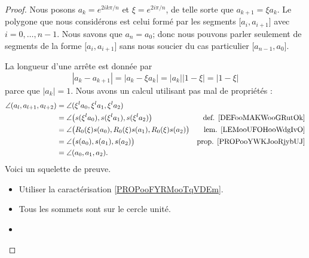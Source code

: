 \begin{proof}
    Nous posons \( a_k= e^{2ik\pi /n}\) et \( \xi= e^{2i\pi/n}\), de telle sorte que \( a_{k+1}=\xi a_k\). Le polygone que nous considérons est celui formé par les segments \( \mathopen[ a_i , a_{i+1} \mathclose]\) avec \( i=0,\ldots, n-1\). Nous savons que \( a_n=a_0\); donc nous pouvons parler seulement de segments de la forme \( \mathopen[ a_i , a_{i+1} \mathclose]\) sans nous soucier du cas particulier \( \mathopen[ a_{n-1} , a_0 \mathclose]\).
    \begin{subproof}
        \spitem[Longueurs]
        La longueur d'une arrête est donnée par
        \begin{equation}
            | a_k-a_{k+1} |=| a_k-\xi a_k |=| a_k | |1-\xi |=| 1-\xi |
        \end{equation}
        parce que \( | a_k |=1\).
        \spitem[Angles]
            Nous avons un calcul utilisant pas mal de propriétés :
            \begin{subequations}
                \begin{align}
                    \angle(a_l,a_{l+1},a_{l+2})&=\angle(\xi^la_0,\xi^la_1,\xi^la_2)     \\
                    &=\angle\big( s(\xi^la_0),s(\xi^la_1),s(\xi^la_2) \big) &\text{def. \ref{DEFooMAKWooGRutOk}}\\
                    &=\angle\big( R_0(\xi)s(a_0),R_0(\xi)s(a_1),R_0(\xi)s(a_2) \big)    &\text{lem. \ref{LEMooUFOHooWdgIvO}}\\
                    &=\angle\big( s(a_0), s(a_1), s(a_2) \big)      &\text{prop. \ref{PROPooYWKJooRjybUJ}}\\
                    &=\angle(a_0,a_1,a_2).
                \end{align}
            \end{subequations}
            \spitem[Convexe]
            Voici un squelette de preuve.
            \begin{itemize}
                \item Utiliser la caractérisation \ref{PROPooFYRMooTqVDEm}.
                \item
                    Tous les sommets sont sur le cercle unité.
                \item

\end{itemize}
\end{subproof}
\end{proof}
